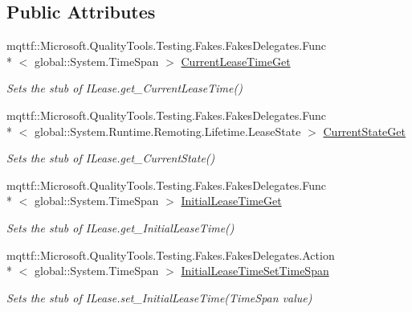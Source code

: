 \subsection*{Public Attributes}
\begin{DoxyCompactItemize}
\item 
mqttf\-::\-Microsoft.\-Quality\-Tools.\-Testing.\-Fakes.\-Fakes\-Delegates.\-Func\\*
$<$ global\-::\-System.\-Time\-Span $>$ \hyperlink{class_system_1_1_runtime_1_1_remoting_1_1_lifetime_1_1_fakes_1_1_stub_i_lease_a15ef5fda70a106d9702cbd1086cb11bf}{Current\-Lease\-Time\-Get}
\begin{DoxyCompactList}\small\item\em Sets the stub of I\-Lease.\-get\-\_\-\-Current\-Lease\-Time()\end{DoxyCompactList}\item 
mqttf\-::\-Microsoft.\-Quality\-Tools.\-Testing.\-Fakes.\-Fakes\-Delegates.\-Func\\*
$<$ global\-::\-System.\-Runtime.\-Remoting.\-Lifetime.\-Lease\-State $>$ \hyperlink{class_system_1_1_runtime_1_1_remoting_1_1_lifetime_1_1_fakes_1_1_stub_i_lease_ad390be9748313de587622dba1e40ba00}{Current\-State\-Get}
\begin{DoxyCompactList}\small\item\em Sets the stub of I\-Lease.\-get\-\_\-\-Current\-State()\end{DoxyCompactList}\item 
mqttf\-::\-Microsoft.\-Quality\-Tools.\-Testing.\-Fakes.\-Fakes\-Delegates.\-Func\\*
$<$ global\-::\-System.\-Time\-Span $>$ \hyperlink{class_system_1_1_runtime_1_1_remoting_1_1_lifetime_1_1_fakes_1_1_stub_i_lease_a71e2ffa307eb405b29a69623bd76c3ed}{Initial\-Lease\-Time\-Get}
\begin{DoxyCompactList}\small\item\em Sets the stub of I\-Lease.\-get\-\_\-\-Initial\-Lease\-Time()\end{DoxyCompactList}\item 
mqttf\-::\-Microsoft.\-Quality\-Tools.\-Testing.\-Fakes.\-Fakes\-Delegates.\-Action\\*
$<$ global\-::\-System.\-Time\-Span $>$ \hyperlink{class_system_1_1_runtime_1_1_remoting_1_1_lifetime_1_1_fakes_1_1_stub_i_lease_a50aafa48b81ef08090016361b42dc596}{Initial\-Lease\-Time\-Set\-Time\-Span}
\begin{DoxyCompactList}\small\item\em Sets the stub of I\-Lease.\-set\-\_\-\-Initial\-Lease\-Time(\-Time\-Span value)\end{DoxyCompactList}\item 

\end{DoxyCompactItemize}
